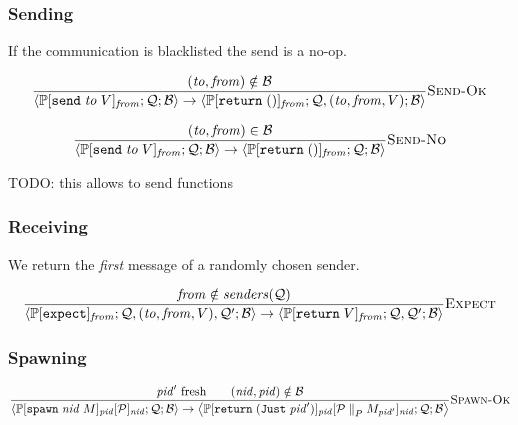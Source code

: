 \documentclass{article}
\newcommand{\sReturn}{\mathtt{return}}
\newcommand{\sExpect}{\mathtt{expect}}
\newcommand{\sSend}{\mathtt{send}}
\newcommand{\sSpawn}{\mathtt{spawn}}
\newcommand{\sParP}{\mathrel{{\parallel}_P}}
\newcommand{\sPid}{\ensuremath{\mathit{pid}}}
\newcommand{\sNid}{\ensuremath{\mathit{nid}}}
\newcommand{\sSystem}[3]{\left\langle #1 ; #2 ; #3 \right\rangle}
\newcommand{\sQueue}{\mathcal{Q}}
\newcommand{\sProcesses}{\mathcal{P}}
\newcommand{\sBlacklist}{\mathcal{B}}
\newcommand{\sJust}[1]{\mathtt{Just} \; {#1}}
\newcommand{\sCtxt}[1]{\mathbb{#1}}
\newcommand{\sSenders}{\mathit{senders}}
\begin{document}
\subsubsection{Sending}

If the communication is blacklisted the send is a no-op.

\begin{equation*}
\frac{
(\mathit{to}, \mathit{from}) \notin \sBlacklist
}{
  \sSystem{\sCtxt{P}[ \sSend \; \mathit{to} \; V ]_\mathit{from}}
          {\sQueue}
          {\sBlacklist}
\rightarrow 
  \sSystem{\sCtxt{P}[ \sReturn \; () ]_\mathit{from}}
          {\sQueue, (\mathit{to}, \mathit{from}, V)}
          {\sBlacklist}
} \textsc{Send-Ok}
\end{equation*}

\begin{equation*}
\frac{
(\mathit{to}, \mathit{from}) \in \sBlacklist
}{
  \sSystem{\sCtxt{P}[ \sSend \; \mathit{to} \; V ]_\mathit{from}}
          {\sQueue}
          {\sBlacklist}
\rightarrow 
  \sSystem{\sCtxt{P}[ \sReturn \; () ]_\mathit{from}}
          {\sQueue}
          {\sBlacklist}
} \textsc{Send-No}
\end{equation*}

TODO: this allows to send functions

\subsubsection{Receiving}

We return the \emph{first} message of a randomly chosen sender.

\begin{equation*}
\frac{
  \mathit{from} \notin \sSenders(\sQueue)
}{
  \sSystem{\sCtxt{P}[ \sExpect ]_\mathit{from}}
          {\sQueue, (\mathit{to}, \mathit{from}, V), \sQueue'}
          {\sBlacklist}
\rightarrow
  \sSystem{\sCtxt{P}[ \sReturn \; V ]_\mathit{from}}
          {\sQueue, \sQueue'}
          {\sBlacklist}
} \textsc{Expect}
\end{equation*}

\subsubsection{Spawning}

\begin{equation*}
\frac{
  \sPid' \text{ fresh} \qquad
  (\sNid, \sPid) \notin \sBlacklist
}{
  \sSystem{\sCtxt{P}[ \sSpawn \; \sNid \; M ]_\sPid[\sProcesses]_\sNid}
          {\sQueue}
          {\sBlacklist}
\rightarrow          
  \sSystem{\sCtxt{P}[ \sReturn \; (\sJust{\sPid'}) ]_\sPid[\sProcesses \sParP M_{\sPid'}]_\sNid}
          {\sQueue}
          {\sBlacklist}
} \textsc{Spawn-Ok}
\end{equation*}
\end{document}
